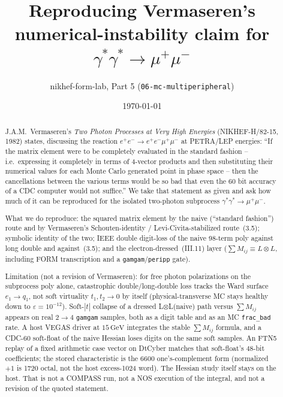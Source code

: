 \documentclass[11pt]{article}
\title{Reproducing Vermaseren's numerical-instability claim for\\
$\gamma^*\gamma^*\to\mu^+\mu^-$}
\author{nikhef-form-lab, Part 5 (\texttt{06-mc-multiperipheral})}
\date{\today}
\begin{document}
\maketitle

\begin{abstract}
J.A.M.\ Vermaseren's \emph{Two Photon Processes at Very High Energies}
(NIKHEF-H/82-15, 1982) states, discussing the reaction
$e^+e^-\to e^+e^-\mu^+\mu^-$ at PETRA/LEP energies: ``If the matrix element
were to be completely evaluated in the standard fashion -- i.e.\ expressing
it completely in terms of 4-vector products and then substituting their
numerical values for each Monte Carlo generated point in phase space --
then the cancellations between the various terms would be so bad that even
the 60 bit accuracy of a CDC computer would not suffice.'' We take that
statement as given and ask how much of it can be reproduced for the
isolated two-photon subprocess $\gamma^*\gamma^*\to\mu^+\mu^-$.

What we do reproduce: the squared matrix element by the naive
(``standard fashion'') route and by Vermaseren's Schouten-identity /
Levi-Civita-stabilized route~(3.5); symbolic identity of the two;
IEEE double digit-loss of the naive 98-term poly against long double
and against~(3.5); and the electron-dressed~(III.11) layer
($\sum M_{ij}\equiv L\otimes L$, including FORM transcription and a
\texttt{gamgam}/\texttt{peripp} gate).

Limitation (not a revision of Vermaseren): for free photon polarizations
on the subprocess poly alone, catastrophic double/long-double loss tracks
the Ward surface $e_1\to q_1$, not soft virtuality $t_1,t_2\to0$ by itself
(physical-transverse MC stays healthy down to $\varepsilon=10^{-12}$).
Soft-$|t|$ collapse of a dressed L$\otimes$L(naive) path versus
$\sum M_{ij}$ appears on real $2\to4$ \texttt{gamgam} samples, both as a
digit table and as an MC \texttt{frac\_bad} rate. A host VEGAS driver at
$15\,\mathrm{GeV}$ integrates the stable $\sum M_{ij}$ formula, and a
CDC-60 soft-float of the naive Hessian loses digits on the same soft
samples. An FTN5 replay of a fixed arithmetic case vector on DtCyber
matches that soft-float's 48-bit coefficients; the stored
characteristic is the 6600 one's-complement form (normalized $+1$ is
1720 octal, not the host excess-1024 word). The Hessian study itself
stays on the host. That is not a COMPASS run, not a NOS execution of
the integral, and not a revision of the quoted statement.
\end{abstract}
\end{document}
